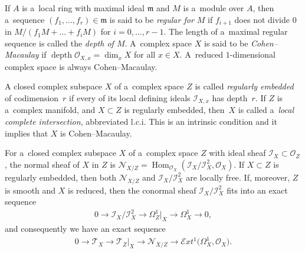 \documentclass[11pt]{article}
\numberwithin{equation}{section}
\begin{document}
If $A$ is a~local ring with maximal ideal $\mathfrak{m}$ and $M$ is a~module over $A$, then a~sequence
$(f_1,\dots,f_r)\in \mathfrak{m}$ is said to be {\em regular for $M$} if $f_{i+1}$ does not divide $0$ in
$M/(f_1M+\dots+f_iM)$ for $i=0,\dots, r-1$.
The length of a~maximal regular sequence is called the {\em depth of $M$}.
A~complex space $X$ is said to be {\em Cohen--Macaulay} if $\operatorname{depth}{\mathcal{O}}_{X,x}=\dim_xX$ for all
$x\in X$.
A~reduced $1$-dimensional complex space is always Cohen--Macaulay.

A closed complex subspace $X$ of a~complex space $Z$ is called {\em regularly embedded} of codimension~$r$ if every of
its local def\/ining ideals $ {\mathcal{I}}_{X,x}$ has depth~$r$.
If $Z$ is a~complex manifold, and $X\subset Z$ is regularly embedded, then~$X$ is called a~{\em local complete
intersection}, abbreviated l.c.i.
This is an intrinsic condition and it implies that $X$ is Cohen--Macaulay.

For a~closed complex subspace $X$ of a~complex space $Z$ with ideal sheaf $ {\mathcal{I}}_X\subset {\mathcal{O}}_Z$, the
normal sheaf of $X$ in $Z$ is ${\mathcal{N}}_{X/Z}=\operatorname{Hom}_{{\mathcal{O}}_X}( {\mathcal{I}}_X/
{\mathcal{I}}_X^2,{\mathcal{O}}_X)$.
If $X\subset Z$ is regularly embedded, then both ${\mathcal{N}}_{X/Z}$ and $ {\mathcal{I}}_X/ {\mathcal{I}}_X^2$ are
locally free.
If, moreover, $Z$ is smooth and $X$ is reduced, then the conormal sheaf $ {\mathcal{I}}_X/ {\mathcal{I}}_X^2$ f\/its into
an exact sequence
\begin{gather*}
0\to {\mathcal{I}}_X/ {\mathcal{I}}_X^2\to \Omega^1_Z|_X\to \Omega^1_X\to 0,
\end{gather*}
and consequently we have an exact sequence
\begin{gather*}
0\to {\mathcal{T}}_X\to {\mathcal{T}}_Z|_X\to {\mathcal{N}}_{X/Z}\to \mathcal{E}xt^1\big(\Omega^1_X,{\mathcal{O}}_X\big).
\end{gather*}
\end{document}
